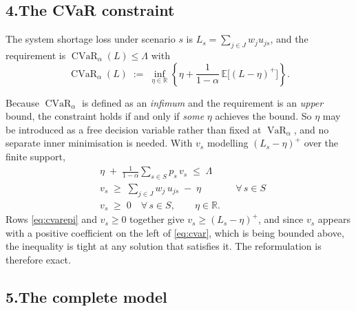 \documentclass[11pt]{article}
\DeclareMathOperator{\CVaR}{CVaR}
\DeclareMathOperator{\VaR}{VaR}
\theoremstyle{definition}\newtheorem*{definition}{Definition}
\theoremstyle{definition}
\begin{document}
\subsection*{4.\quad The CVaR constraint}

The system shortage loss under scenario $s$ is
$L_s = \sum_{j \in J} w_j u_{js}$, and the requirement is
$\CVaR_{\alpha}(L) \le \Lambda$ with
\[
  \CVaR_{\alpha}(L) \;:=\;
  \inf_{\eta \in \mathbb{R}}
  \left\{ \eta + \frac{1}{1-\alpha}\,
    \mathbb{E}\big[(L-\eta)^{+}\big] \right\} .
\]

Because $\CVaR_\alpha$ is defined as an \emph{infimum} and the
requirement is an \emph{upper} bound, the constraint holds if and only if
\emph{some} $\eta$ achieves the bound. So $\eta$ may be introduced as a
free decision variable rather than fixed at $\VaR_\alpha$, and no
separate inner minimisation is needed. With $v_s$ modelling
$(L_s - \eta)^{+}$ over the finite support,
\begin{align}
  & \eta \;+\; \frac{1}{1-\alpha}
      \sum_{s \in S} p_s\, v_s \;\le\; \Lambda \label{eq:cvar}\\
  & v_s \;\ge\; \sum_{j \in J} w_j\, u_{js} \;-\; \eta
    && \forall\, s \in S \label{eq:cvarepi}\\
  & v_s \;\ge\; 0 \quad \forall\, s \in S,
    \qquad \eta \in \mathbb{R} .
\end{align}
Rows \eqref{eq:cvarepi} and $v_s \ge 0$ together give
$v_s \ge (L_s - \eta)^{+}$, and since $v_s$ appears with a positive
coefficient on the left of \eqref{eq:cvar}, which is being bounded above,
the inequality is tight at any solution that satisfies it. The
reformulation is therefore exact.

\subsection*{5.\quad The complete model}
\end{document}
